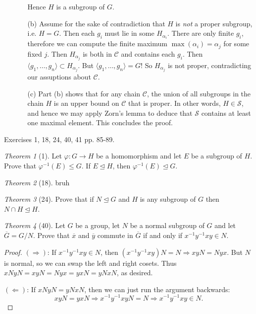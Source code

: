 \documentclass[12pt]{article}
\theoremstyle{remark}
\theoremstyle{named}
\newtheorem*{theorem}{Theorem}
\renewcommand{\bar}{\overline}
\renewcommand{\implies}{\Rightarrow}
\newcommand{\coimplies}{\Leftarrow}
\newcommand{\normal}{\trianglelefteq}
\begin{document}
\begin{enumerate}
\begin{enumerate}
        Hence \(H\) is a subgroup of \(G\).

        \item[(b)] Assume for the sake of contradiction that \(H\) is \textit{not} a proper subgroup, i.e. \(H = G\). Then each \(g_i\) must lie in some \(H_{\alpha_i}\). There are only finite \(g_i\), therefore we can compute the finite maximum \(\max (\alpha_i) = \alpha_j\) for some fixed \(j\). Then \(H_{\alpha_j}\) is both in \(\mathcal C\) and contains each \(g_i\). 
        Then \(\langle g_1, \dots, g_n\rangle \subset H_{\alpha_j}\). But \(\langle g_1, \dots, g_n\rangle = G\)! So \(H_{\alpha_j}\) is not proper, contradicting our assuptions about \(\mathcal C\).
          
        \item[(c)] Part (b) shows that for any chain \(\mathcal C\), the union of all subgroups in the chain \(H\) is an upper bound on \(\mathcal C\) that is proper. In other words, \(H \in \mathcal S\), and hence we may apply Zorn's lemma to deduce that \(\mathcal S\) contains at least one maximal element. This concludes the proof.
    \end{enumerate}
\end{enumerate}

Exercises 1, 18, 24, 40, 41 pp. 85-89.

\begin{theorem}[1]
    Let \(\varphi : G \to H\) be a homomorphism and let \(E\) be a subgroup of \(H\). Prove that \(\varphi^{-1}(E) \le G\). If \(E \trianglelefteq H\), then \(\varphi^{-1}(E) \normal G\).
\end{theorem}

\begin{theorem}[18]
    bruh
\end{theorem}

\begin{theorem}[24]
    Prove that if \(N \normal G\) and \(H\) is any subgroup of \(G\) then \(N \cap H \normal H\).
\end{theorem}

\begin{theorem}[40]
    Let \(G\) be a group, let \(N\) be a normal subgroup of \(G\) and let \(\bar{G} = G / N\). Prove that \(\bar x\) and \(\bar y\) commute in \(\bar G\) if and only if \(x^{-1}y^{-1}xy \in N\).
\end{theorem}

\begin{proof}
    \((\implies)\): If \(x^{-1}y^{-1}xy \in N\), then \((x^{-1}y^{-1}xy)N = N \implies xyN = Nyx\). But \(N\) is normal, so we can swap the left and right cosets. Thus \(xN yN = xyN = N yx = yx N = yN xN\), as desired.

    \((\coimplies)\): If \(xN yN = yN xN\), then we can just run the argument backwards:
    \[xyN = yxN \implies x^{-1}y^{-1}xyN = N \implies x^{-1}y^{-1}xy \in N.\]
\end{proof}
\end{document}

